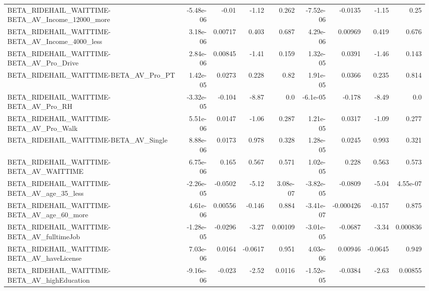 \begin{tabular}{lrrrrrrrr}
BETA\_RIDEHAIL\_WAITTIME-BETA\_AV\_Income\_12000\_more   &   -5.48e-06 &        -0.01 &     -1.12 &    0.262 &  -7.52e-06 &     -0.0135 &        -1.15 &          0.25 \\
BETA\_RIDEHAIL\_WAITTIME-BETA\_AV\_Income\_4000\_less    &    3.18e-06 &      0.00717 &     0.403 &    0.687 &   4.29e-06 &     0.00969 &        0.419 &         0.676 \\
BETA\_RIDEHAIL\_WAITTIME-BETA\_AV\_Pro\_Drive           &    2.84e-06 &      0.00845 &     -1.41 &    0.159 &   1.32e-05 &      0.0391 &        -1.46 &         0.143 \\
BETA\_RIDEHAIL\_WAITTIME-BETA\_AV\_Pro\_PT              &    1.42e-05 &       0.0273 &     0.228 &     0.82 &   1.91e-05 &      0.0366 &        0.235 &         0.814 \\
BETA\_RIDEHAIL\_WAITTIME-BETA\_AV\_Pro\_RH              &   -3.32e-05 &       -0.104 &     -8.87 &      0.0 &   -6.1e-05 &      -0.178 &        -8.49 &           0.0 \\
BETA\_RIDEHAIL\_WAITTIME-BETA\_AV\_Pro\_Walk            &    5.51e-06 &       0.0147 &     -1.06 &    0.287 &   1.21e-05 &      0.0317 &        -1.09 &         0.277 \\
BETA\_RIDEHAIL\_WAITTIME-BETA\_AV\_Single              &    8.88e-06 &       0.0173 &     0.978 &    0.328 &   1.28e-05 &      0.0245 &        0.993 &         0.321 \\
BETA\_RIDEHAIL\_WAITTIME-BETA\_AV\_WAITTIME            &    6.75e-06 &        0.165 &     0.567 &    0.571 &   1.02e-05 &       0.228 &        0.563 &         0.573 \\
BETA\_RIDEHAIL\_WAITTIME-BETA\_AV\_age\_35\_less         &   -2.26e-05 &      -0.0502 &     -5.12 & 3.08e-07 &  -3.82e-05 &     -0.0809 &        -5.04 &      4.55e-07 \\
BETA\_RIDEHAIL\_WAITTIME-BETA\_AV\_age\_60\_more         &    4.61e-06 &      0.00556 &    -0.146 &    0.884 &  -3.41e-07 &   -0.000426 &       -0.157 &         0.875 \\
BETA\_RIDEHAIL\_WAITTIME-BETA\_AV\_fulltimeJob         &   -1.28e-05 &      -0.0296 &     -3.27 &  0.00109 &  -3.01e-05 &     -0.0687 &        -3.34 &      0.000836 \\
BETA\_RIDEHAIL\_WAITTIME-BETA\_AV\_haveLicense         &    7.03e-06 &       0.0164 &   -0.0617 &    0.951 &   4.03e-06 &     0.00946 &      -0.0645 &         0.949 \\
BETA\_RIDEHAIL\_WAITTIME-BETA\_AV\_highEducation       &   -9.16e-06 &       -0.023 &     -2.52 &   0.0116 &  -1.52e-05 &     -0.0384 &        -2.63 &       0.00855 \\

\end{tabular}
